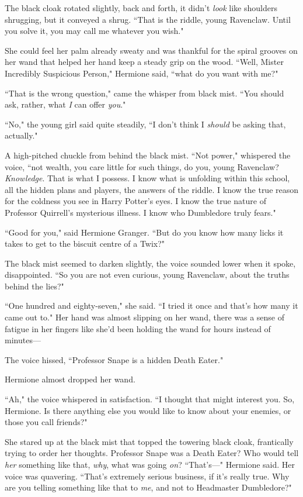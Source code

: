 The black cloak rotated slightly, back and forth, it didn't \emph{look} like shoulders shrugging, but it conveyed a shrug. ``That is the riddle, young Ravenclaw. Until you solve it, you may call me whatever you wish."

She could feel her palm already sweaty and was thankful for the spiral grooves on her wand that helped her hand keep a steady grip on the wood. ``Well, Mister Incredibly Suspicious Person," Hermione said, ``what do you want with me?"

``That is the wrong question," came the whisper from black mist. ``You should ask, rather, what \emph{I} can offer \emph{you}."

``No," the young girl said quite steadily, ``I don't think I \emph{should} be asking that, actually."

A high-pitched chuckle from behind the black mist. ``Not power," whispered the voice, ``not wealth, you care little for such things, do you, young Ravenclaw? \emph{Knowledge}. That is what I possess. I know what is unfolding within this school, all the hidden plans and players, the answers of the riddle. I know the true reason for the coldness you see in Harry Potter's eyes. I know the true nature of Professor Quirrell's mysterious illness. I know who Dumbledore truly fears."

``Good for you," said Hermione Granger. ``But do you know how many licks it takes to get to the biscuit centre of a Twix?"

The black mist seemed to darken slightly, the voice sounded lower when it spoke, disappointed. ``So you are not even curious, young Ravenclaw, about the truths behind the lies?"

``One hundred and eighty-seven," she said. ``I tried it once and that's how many it came out to." Her hand was almost slipping on her wand, there was a sense of fatigue in her fingers like she'd been holding the wand for hours instead of minutes—

The voice hissed, ``Professor Snape is a hidden Death Eater."

Hermione almost dropped her wand.

``Ah," the voice whispered in satisfaction. ``I thought that might interest you. So, Hermione. Is there anything else you would like to know about your enemies, or those you call friends?"

She stared up at the black mist that topped the towering black cloak, frantically trying to order her thoughts. Professor Snape was a Death Eater? Who would tell \emph{her} something like that, \emph{why}, what was going \emph{on}? ``That's—" Hermione said. Her voice was quavering. ``That's extremely serious business, if it's really true. Why are you telling something like that to \emph{me}, and not to Headmaster Dumbledore?"

